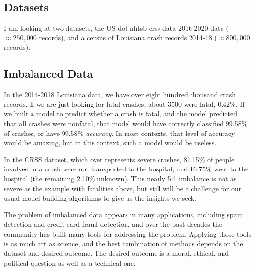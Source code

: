 \subsection{Datasets}

I am looking at two datasets,  the US \acrfull{dot} \acrfull{nhtsb} \acrfull{crss} data 2016-2020 data ($\approx 250,000$ records), and a census of Louisiana crash records 2014-18 ($\approx 800,000$ records).

\subsection{Imbalanced Data}

In the 2014-2018 Louisiana data, we have over eight hundred thousand crash records.  If we are just looking for fatal crashes, about 3500 were fatal, 0.42\%.  If we built a model to predict whether a crash is fatal, and the model predicted that all crashes were nonfatal, that model would have correctly classified 99.58\% of crashes, or have 99.58\% {\it accuracy}.  In most contexts, that level of accuracy would be amazing, but in this context, such a model would be useless. 

In the CRSS dataset, which over represents severe crashes, 81.15\% of people involved in a crash were not transported to the hospital, and 16.75\% went to the hospital (the remaining 2.10\% unknown).  This nearly 5:1 imbalance is not as severe as the example with fatalities above, but still will be a challenge for our usual model building algorithms to give us the insights we seek.

The problem of imbalanced data appears in many applications, including spam detection and credit card fraud detection, and over the past decades the community has built many tools for addressing the problem.  Applying those tools is as much art as science, and the best combination of methods depends on the dataset and desired outcome.  The desired outcome is a moral, ethical, and political question as well as a technical one.  


